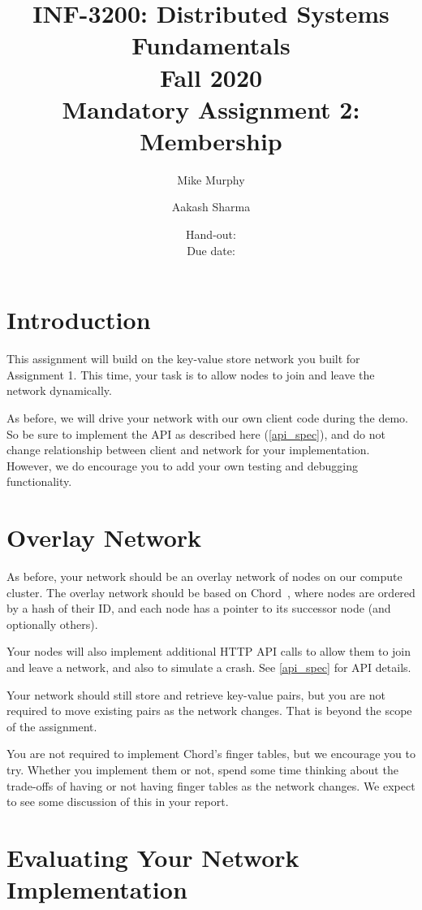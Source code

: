 \documentclass[]{article}
\title{%
INF-3200: Distributed Systems Fundamentals \\
Fall 2020 \\
Mandatory Assignment 2: Membership \\
}
\author{Mike Murphy \and Aakash Sharma}
\date{%
Hand-out: \handoutdate{} \\
Due date: \deadline{} \\
}
\begin{document}
\maketitle

\section{Introduction}

This assignment will build on the key-value store network you built for Assignment 1.
This time, your task is to allow nodes to join and leave the network dynamically.

As before, we will drive your network with our own client code during the demo.
So be sure to implement the API as described here (\autoref{api_spec}),
and do not change relationship between client and network for your implementation.
However, we do encourage you to add your own testing and debugging functionality.

\section{Overlay Network}

As before,
your network should be an overlay network of nodes on our compute cluster.
The overlay network should be based on Chord~\cite{stoica2003chord},
where nodes are ordered by a hash of their ID,
and each node has a pointer to its successor node (and optionally others).

Your nodes will also implement additional HTTP API calls
to allow them to join and leave a network,
and also to simulate a crash. See \autoref{api_spec} for API details.

Your network should still store and retrieve key-value pairs,
but you are not required to move existing pairs as the network changes.
That is beyond the scope of the assignment.

You are not required to implement Chord's finger tables,
but we encourage you to try.
Whether you implement them or not,
spend some time thinking about the trade-offs of having or not having finger tables as the network changes.
We expect to see some discussion of this in your report.

\section{Evaluating Your Network Implementation}
\label{required_experiments}
\end{document}
